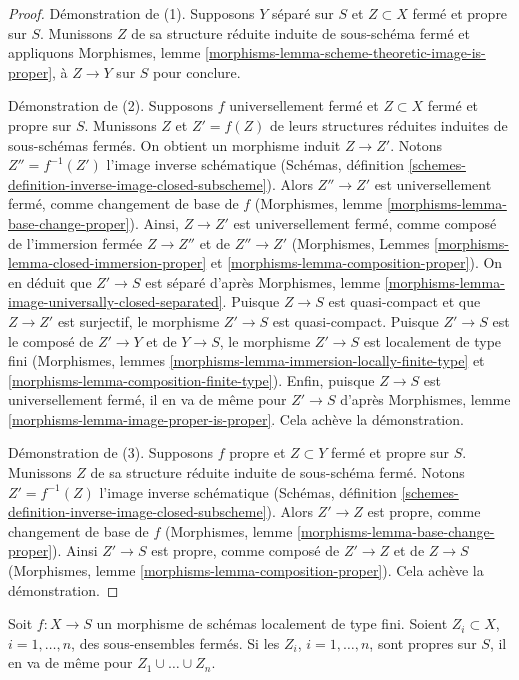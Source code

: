 \begin{proof}
Démonstration de (1). Supposons $Y$ séparé sur $S$ et $Z \subset X$
fermé et propre sur $S$. Munissons $Z$ de sa structure réduite
induite de sous-schéma fermé et appliquons
Morphismes, lemme \ref{morphisms-lemma-scheme-theoretic-image-is-proper},
à $Z \to Y$ sur $S$ pour conclure.

\medskip\noindent
Démonstration de (2). Supposons $f$ universellement fermé et $Z \subset X$ fermé
et propre sur $S$. Munissons $Z$ et $Z' = f(Z)$ de leurs structures
réduites induites de sous-schémas fermés. On obtient un morphisme
induit $Z \to Z'$.
Notons $Z'' = f^{-1}(Z')$ l'image inverse schématique (Schémas,
définition \ref{schemes-definition-inverse-image-closed-subscheme}).
Alors $Z'' \to Z'$ est universellement fermé, comme changement de base de $f$
(Morphismes, lemme \ref{morphisms-lemma-base-change-proper}).
Ainsi, $Z \to Z'$ est universellement fermé, comme composé de
l'immersion fermée $Z \to Z''$ et de $Z'' \to Z'$
(Morphismes, Lemmes
\ref{morphisms-lemma-closed-immersion-proper} et
\ref{morphisms-lemma-composition-proper}).
On en déduit que $Z' \to S$ est séparé d'après
Morphismes, lemme \ref{morphisms-lemma-image-universally-closed-separated}.
Puisque $Z \to S$ est quasi-compact et que $Z \to Z'$ est surjectif,
le morphisme $Z' \to S$ est quasi-compact.
Puisque $Z' \to S$ est le composé de $Z' \to Y$ et de $Y \to S$,
le morphisme $Z' \to S$ est localement de type fini
(Morphismes, lemmes \ref{morphisms-lemma-immersion-locally-finite-type} et
\ref{morphisms-lemma-composition-finite-type}).
Enfin, puisque $Z \to S$ est universellement fermé, il
en va de même pour $Z' \to S$ d'après
Morphismes, lemme \ref{morphisms-lemma-image-proper-is-proper}.
Cela achève la démonstration.

\medskip\noindent
Démonstration de (3). Supposons $f$ propre et $Z \subset Y$ fermé et propre
sur $S$. Munissons $Z$ de sa structure réduite induite de sous-schéma
fermé. Notons $Z' = f^{-1}(Z)$ l'image inverse schématique (Schémas,
définition \ref{schemes-definition-inverse-image-closed-subscheme}).
Alors $Z' \to Z$ est propre, comme changement de base de $f$
(Morphismes, lemme \ref{morphisms-lemma-base-change-proper}).
Ainsi $Z' \to S$ est propre, comme composé de $Z' \to Z$
et de $Z \to S$
(Morphismes, lemme \ref{morphisms-lemma-composition-proper}).
Cela achève la démonstration.
\end{proof}

\begin{lemma}
\label{lemma-union-closed-proper-over-base}
Soit $f : X \to S$ un morphisme de schémas localement de type fini.
Soient $Z_i \subset X$, $i = 1, \ldots, n$, des sous-ensembles fermés.
Si les $Z_i$, $i = 1, \ldots, n$, sont propres sur $S$, il en va de
même pour $Z_1 \cup \ldots \cup Z_n$.
\end{lemma}

